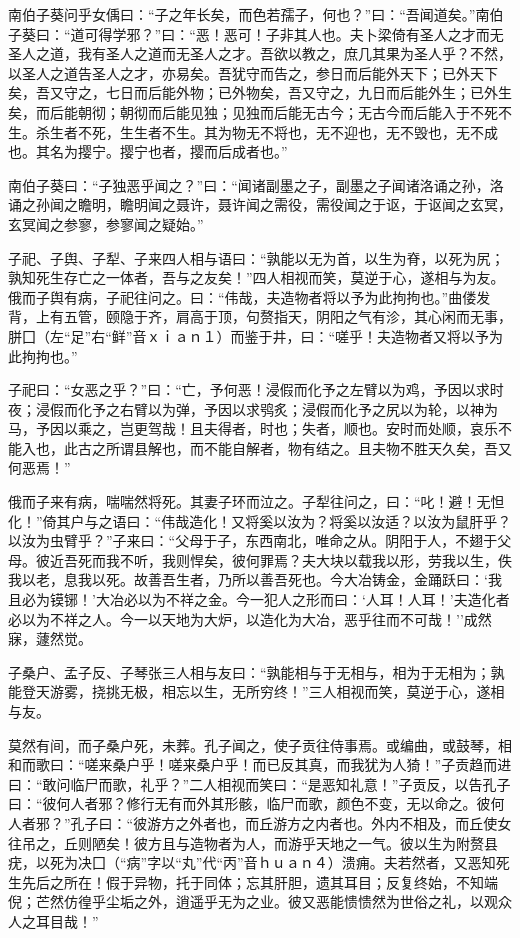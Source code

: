 \documentclass[]{article}
\begin{document}
南伯子葵问乎女偊曰：``子之年长矣，而色若孺子，何也？''曰：``吾闻道矣。''南伯子葵曰：``道可得学邪？''曰：``恶！恶可！子非其人也。夫卜梁倚有圣人之才而无圣人之道，我有圣人之道而无圣人之才。吾欲以教之，庶几其果为圣人乎？不然，以圣人之道告圣人之才，亦易矣。吾犹守而告之，参日而后能外天下；已外天下矣，吾又守之，七日而后能外物；已外物矣，吾又守之，九日而后能外生；已外生矣，而后能朝彻；朝彻而后能见独；见独而后能无古今；无古今而后能入于不死不生。杀生者不死，生生者不生。其为物无不将也，无不迎也，无不毁也，无不成也。其名为撄宁。撄宁也者，撄而后成者也。''

南伯子葵曰：``子独恶乎闻之？''曰：``闻诸副墨之子，副墨之子闻诸洛诵之孙，洛诵之孙闻之瞻明，瞻明闻之聂许，聂许闻之需役，需役闻之于讴，于讴闻之玄冥，玄冥闻之参寥，参寥闻之疑始。''

子祀、子舆、子犁、子来四人相与语曰：``孰能以无为首，以生为脊，以死为尻；孰知死生存亡之一体者，吾与之友矣！''四人相视而笑，莫逆于心，遂相与为友。俄而子舆有病，子祀往问之。曰：``伟哉，夫造物者将以予为此拘拘也。''曲偻发背，上有五管，颐隐于齐，肩高于顶，句赘指天，阴阳之气有沴，其心闲而无事，胼囗（左``足''右``鲜''音ｘｉａｎ１）而鉴于井，曰：``嗟乎！夫造物者又将以予为此拘拘也。''

子祀曰：``女恶之乎？''曰：``亡，予何恶！浸假而化予之左臂以为鸡，予因以求时夜；浸假而化予之右臂以为弹，予因以求鸮炙；浸假而化予之尻以为轮，以神为马，予因以乘之，岂更驾哉！且夫得者，时也；失者，顺也。安时而处顺，哀乐不能入也，此古之所谓县解也，而不能自解者，物有结之。且夫物不胜天久矣，吾又何恶焉！''

俄而子来有病，喘喘然将死。其妻子环而泣之。子犁往问之，曰：``叱！避！无怛化！''倚其户与之语曰：``伟哉造化！又将奚以汝为？将奚以汝适？以汝为鼠肝乎？以汝为虫臂乎？''子来曰：``父母于子，东西南北，唯命之从。阴阳于人，不翅于父母。彼近吾死而我不听，我则悍矣，彼何罪焉？夫大块以载我以形，劳我以生，佚我以老，息我以死。故善吾生者，乃所以善吾死也。今大冶铸金，金踊跃曰：`我且必为镆铘！'大冶必以为不祥之金。今一犯人之形而曰：`人耳！人耳！'夫造化者必以为不祥之人。今一以天地为大炉，以造化为大冶，恶乎往而不可哉！''成然寐，蘧然觉。

子桑户、孟子反、子琴张三人相与友曰：``孰能相与于无相与，相为于无相为；孰能登天游雾，挠挑无极，相忘以生，无所穷终！''三人相视而笑，莫逆于心，遂相与友。

莫然有间，而子桑户死，未葬。孔子闻之，使子贡往侍事焉。或编曲，或鼓琴，相和而歌曰：``嗟来桑户乎！嗟来桑户乎！而已反其真，而我犹为人猗！''子贡趋而进曰：``敢问临尸而歌，礼乎？''二人相视而笑曰：``是恶知礼意！''子贡反，以告孔子曰：``彼何人者邪？修行无有而外其形骸，临尸而歌，颜色不变，无以命之。彼何人者邪？''孔子曰：``彼游方之外者也，而丘游方之内者也。外内不相及，而丘使女往吊之，丘则陋矣！彼方且与造物者为人，而游乎天地之一气。彼以生为附赘县疣，以死为决囗（``病''字以``丸''代``丙''音ｈｕａｎ４）溃痈。夫若然者，又恶知死生先后之所在！假于异物，托于同体；忘其肝胆，遗其耳目；反复终始，不知端倪；芒然仿徨乎尘垢之外，逍遥乎无为之业。彼又恶能愦愦然为世俗之礼，以观众人之耳目哉！''
\end{document}

